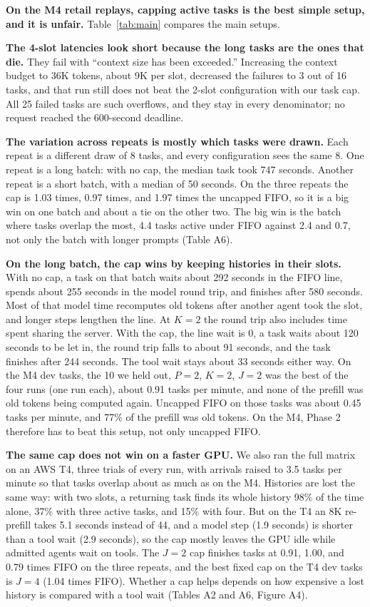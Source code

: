 \documentclass[9pt,twocolumn]{extarticle}
\begin{document}
\textbf{On the M4 retail replays, capping active tasks is the best simple setup, and it is unfair.} Table~\ref{tab:main} compares the main setups.

\textbf{The 4-slot latencies look short because the long tasks are the ones that die.} They fail with ``context size has been exceeded.'' Increasing the context budget to 36K tokens, about 9K per slot, decreased the failures to 3 out of 16 tasks, and that run still does not beat the 2-slot configuration with our task cap. All 25 failed tasks are such overflows, and they stay in every denominator; no request reached the 600-second deadline.

\textbf{The variation across repeats is mostly which tasks were drawn.} Each repeat is a different draw of 8 tasks, and every configuration sees the same 8. One repeat is a long batch: with no cap, the median task took 747 seconds. Another repeat is a short batch, with a median of 50 seconds. On the three repeats the cap is 1.03 times, 0.97 times, and 1.97 times the uncapped FIFO, so it is a big win on one batch and about a tie on the other two. The big win is the batch where tasks overlap the most, 4.4 tasks active under FIFO against 2.4 and 0.7, not only the batch with longer prompts (Table A6).

\textbf{On the long batch, the cap wins by keeping histories in their slots.} With no cap, a task on that batch waits about 292 seconds in the FIFO line, spends about 255 seconds in the model round trip, and finishes after 580 seconds. Most of that model time recomputes old tokens after another agent took the slot, and longer steps lengthen the line. At $K = 2$ the round trip also includes time spent sharing the server. With the cap, the line wait is 0, a task waits about 120 seconds to be let in, the round trip falls to about 91 seconds, and the task finishes after 244 seconds. The tool wait stays about 33 seconds either way. On the M4 dev tasks, the 10 we held out, $P = 2$, $K = 2$, $J = 2$ was the best of the four runs (one run each), about 0.91 tasks per minute, and none of the prefill was old tokens being computed again. Uncapped FIFO on those tasks was about 0.45 tasks per minute, and 77\% of the prefill was old tokens. On the M4, Phase 2 therefore has to beat this setup, not only uncapped FIFO.

\textbf{The same cap does not win on a faster GPU.} We also ran the full matrix on an AWS T4, three trials of every run, with arrivals raised to 3.5 tasks per minute so that tasks overlap about as much as on the M4. Histories are lost the same way: with two slots, a returning task finds its whole history 98\% of the time alone, 37\% with three active tasks, and 15\% with four. But on the T4 an 8K re-prefill takes 5.1 seconds instead of 44, and a model step (1.9 seconds) is shorter than a tool wait (2.9 seconds), so the cap mostly leaves the GPU idle while admitted agents wait on tools. The $J = 2$ cap finishes tasks at 0.91, 1.00, and 0.79 times FIFO on the three repeats, and the best fixed cap on the T4 dev tasks is $J = 4$ (1.04 times FIFO). Whether a cap helps depends on how expensive a lost history is compared with a tool wait (Tables A2 and A6, Figure A4).
\end{document}
